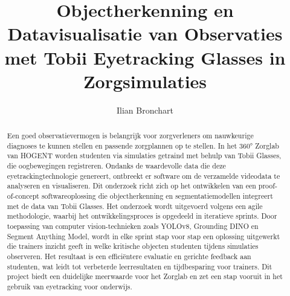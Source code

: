 \documentclass[dutch]{hogent-article}
\title{Objectherkenning en Datavisualisatie van Observaties met Tobii Eyetracking Glasses in Zorgsimulaties}
\author{Ilian Bronchart}
\begin{document}
\begin{abstract}
Een goed observatievermogen is belangrijk voor zorgverleners om nauwkeurige diagnoses te kunnen 
stellen en passende zorgplannen op te stellen. In het 360° Zorglab van HOGENT worden studenten 
via simulaties getraind met behulp van Tobii Glasses, die oogbewegingen registreren. Ondanks de 
waardevolle data die deze eyetrackingtechnologie genereert, ontbreekt er software om de verzamelde 
videodata te analyseren en visualiseren. Dit onderzoek richt zich op het ontwikkelen van een 
proof-of-concept softwareoplossing die objectherkenning en segmentatiemodellen integreert 
met de data van Tobii Glasses. Het onderzoek wordt uitgevoerd volgens een agile methodologie, 
waarbij het ontwikkelingsproces is opgedeeld in iteratieve sprints. 
Door toepassing van computer vision-technieken zoals 
YOLOv8, Grounding DINO en Segment Anything Model, wordt in elke sprint stap voor stap een oplossing uitgewerkt 
die trainers inzicht geeft in welke kritische objecten studenten tijdens simulaties observeren.
Het resultaat is een efficiëntere evaluatie en gerichte feedback aan studenten, wat leidt tot 
verbeterde leerresultaten en tijdbesparing voor trainers. Dit project biedt een duidelijke meerwaarde 
voor het Zorglab en zet een stap vooruit in het gebruik van eyetracking voor onderwijs.
\end{abstract}

\tableofcontents



\printbibliography[heading=bibintoc]
\end{document}
